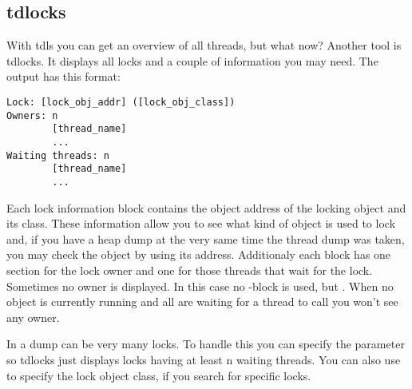 \subsection{tdlocks}

With tdls you can get an overview of all threads, but what now?
Another tool is tdlocks.
It displays all locks and a couple of information you may need.
The output has this format:
\begin{lstlisting}
Lock: [lock_obj_addr] ([lock_obj_class])
Owners: n
        [thread_name]
        ...
Waiting threads: n
        [thread_name]
        ...
\end{lstlisting}

Each lock information block contains the object address of the locking object and its class.
These information allow you to see what kind of object is used to lock and, if you have a heap dump at the very same time the thread dump was taken, you may check the object by using its address.
Additionaly each block has one section for the lock owner and one for those threads that wait for the lock.
Sometimes no owner is displayed.
In this case no -block is used, but .
When no object is currently running and all are waiting for a thread to call  you won't see any owner.

In a dump can be very many locks.
To handle this you can specify the  parameter so tdlocks just displays locks having at least n waiting threads.
You can also use  to specify the lock object class, if you search for specific locks.
